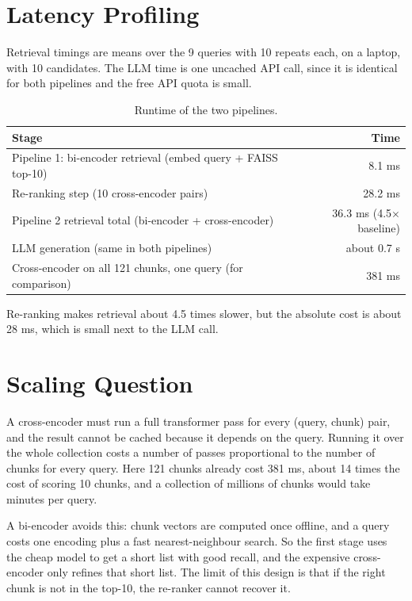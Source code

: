 \documentclass[11pt,a4paper]{article}
\begin{document}
\section{Latency Profiling}
Retrieval timings are means over the 9 queries with 10 repeats each, on a laptop, with 10 candidates. The LLM time is one uncached API call, since it is identical for both pipelines and the free API quota is small.

\begin{table}[h]
\centering\small
\begin{tabular}{@{}lr@{}}
\toprule
Stage & Time \\
\midrule
Pipeline 1: bi-encoder retrieval (embed query + FAISS top-10) & 8.1 ms \\
Re-ranking step (10 cross-encoder pairs) & 28.2 ms \\
Pipeline 2 retrieval total (bi-encoder + cross-encoder) & 36.3 ms (4.5$\times$ baseline) \\
LLM generation (same in both pipelines) & about 0.7 s \\
\midrule
Cross-encoder on all 121 chunks, one query (for comparison) & 381 ms \\
\bottomrule
\end{tabular}
\caption{Runtime of the two pipelines.}
\end{table}

Re-ranking makes retrieval about 4.5 times slower, but the absolute cost is about 28 ms, which is small next to the LLM call.

\section{Scaling Question}
A cross-encoder must run a full transformer pass for every (query, chunk) pair, and the result cannot be cached because it depends on the query. Running it over the whole collection costs a number of passes proportional to the number of chunks for every query. Here 121 chunks already cost 381 ms, about 14 times the cost of scoring 10 chunks, and a collection of millions of chunks would take minutes per query.

A bi-encoder avoids this: chunk vectors are computed once offline, and a query costs one encoding plus a fast nearest-neighbour search. So the first stage uses the cheap model to get a short list with good recall, and the expensive cross-encoder only refines that short list. The limit of this design is that if the right chunk is not in the top-10, the re-ranker cannot recover it.

\newpage

\end{document}
